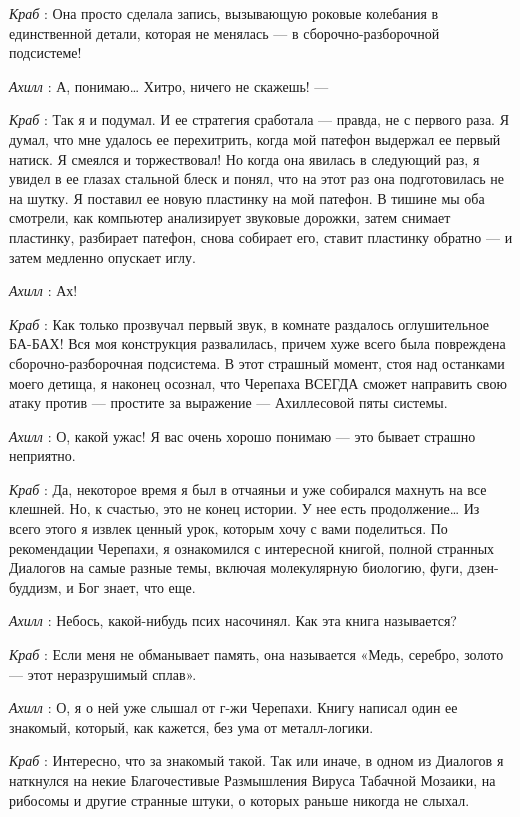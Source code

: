 \documentclass[../main.tex]{subfiles}
\begin{document}
\begin{dialogue}
\emph{Краб} : Она просто сделала запись, вызывающую роковые колебания в единственной детали, которая не менялась --- в сборочно-разборочной подсистеме!

\emph{Ахилл} : А, понимаю\ldots{} Хитро, ничего не скажешь! ---

\emph{Краб} : Так я и подумал. И ее стратегия сработала --- правда, не с первого раза. Я думал, что мне удалось ее перехитрить, когда мой патефон выдержал ее первый натиск. Я смеялся и торжествовал! Но когда она явилась в следующий раз, я увидел в ее глазах стальной блеск и понял, что на этот раз она подготовилась не на шутку. Я поставил ее новую пластинку на мой патефон. В тишине мы оба смотрели, как компьютер анализирует звуковые дорожки, затем снимает пластинку, разбирает патефон, снова собирает его, ставит пластинку обратно --- и затем медленно опускает иглу.

\emph{Ахилл} : Ах!

\emph{Краб} : Как только прозвучал первый звук, в комнате раздалось оглушительное БА-БАХ! Вся моя конструкция развалилась, причем хуже всего была повреждена сборочно-разборочная подсистема. В этот страшный момент, стоя над останками моего детища, я наконец осознал, что Черепаха ВСЕГДА сможет направить свою атаку против --- простите за выражение --- Ахиллесовой пяты системы.

\emph{Ахилл} : О, какой ужас! Я вас очень хорошо понимаю --- это бывает страшно неприятно.

\emph{Краб} : Да, некоторое время я был в отчаяньи и уже собирался махнуть на все клешней. Но, к счастью, это не конец истории. У нее есть продолжение\ldots{} Из всего этого я извлек ценный урок, которым хочу с вами поделиться. По рекомендации Черепахи, я ознакомился с интересной книгой, полной странных Диалогов на самые разные темы, включая молекулярную биологию, фуги, дзен-буддизм, и Бог знает, что еще.

\emph{Ахилл} : Небось, какой-нибудь псих насочинял. Как эта книга называется?

\emph{Краб} : Если меня не обманывает память, она называется «Медь, серебро, золото --- этот неразрушимый сплав».

\emph{Ахилл} : О, я о ней уже слышал от г-жи Черепахи. Книгу написал один ее знакомый, который, как кажется, без ума от металл-логики.

\emph{Краб} : Интересно, что за знакомый такой. Так или иначе, в одном из Диалогов я наткнулся на некие Благочестивые Размышления Вируса Табачной Мозаики, на рибосомы и другие странные штуки, о которых раньше никогда не слыхал.


\end{dialogue}
\end{document}
